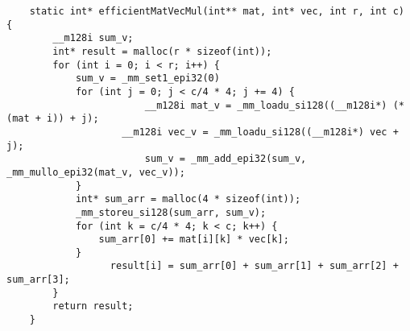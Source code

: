 \begin{solution} [0.5in]
\begin{verbatim}
    static int* efficientMatVecMul(int** mat, int* vec, int r, int c) {
        __m128i sum_v;
        int* result = malloc(r * sizeof(int));
        for (int i = 0; i < r; i++) {
            sum_v = _mm_set1_epi32(0)	
            for (int j = 0; j < c/4 * 4; j += 4) {
                        __m128i mat_v = _mm_loadu_si128((__m128i*) (*(mat + i)) + j);
                    __m128i vec_v = _mm_loadu_si128((__m128i*) vec + j);
                        sum_v = _mm_add_epi32(sum_v, _mm_mullo_epi32(mat_v, vec_v));
            }
            int* sum_arr = malloc(4 * sizeof(int));
            _mm_storeu_si128(sum_arr, sum_v);
            for (int k = c/4 * 4; k < c; k++) { 
                sum_arr[0] += mat[i][k] * vec[k]; 
            }
                  result[i] = sum_arr[0] + sum_arr[1] + sum_arr[2] + sum_arr[3];
        }
        return result;
    }
\end{verbatim}
\end{solution}


    
